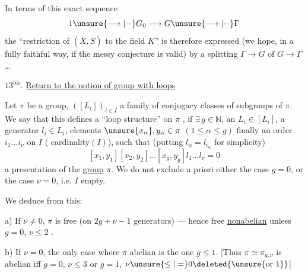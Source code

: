 

In terms of this exact sequence
\[
1\unsure{\longrightarrow|-}G_0\longrightarrow G\unsure{\longrightarrow|-}\Gamma
\]
the ``restriction of $(\overline X,\overline S)$ to the field $K$'' is
therefore expressed (we hope, in a fully faithful way,
if the messy conjecture is valid) by
a splitting $\Gamma\to G$ of $G\to\Gamma$\dots

$13^{\mathrm{bis}}$. \uline{Return to the notion of group with loops}

Let $\pi$ be a group, $([L_i])_{i\in I}$ a family
of conjugacy classes of subgroups of
$\pi$. We say that this defines a 
``loop structure'' on $\pi$ \inserted{[of type $(g,\nu)$]}, if $\exists\,g\in\mathbb N$,
 an $L_i\in[L_i]$, a generator
$l_i\in L_i$, elements $\unsure{x_\alpha},y_\alpha\in\pi$ $(1\le\alpha\le g)$
finally an order $i_1\dots i_\nu$ on $I$ ( \inserted{$\nu=$} cardinality$(I)$),
such that (putting $l_\alpha=l_{i_\alpha}$ for simplicity)
\[
[x_1,y_1][x_2,y_2]\dots[x_g,y_g]l_1\dots l_\nu=0
\]
 a presentation of the \uline{group} $\pi$. We
do not exclude a priori either the case $g=0$, or the case $\nu=0$,
i.e. $I$ empty.

We deduce from this:

a) If $\nu\ne0$, $\pi$ is free (on $2g+\nu-1$ generators) ---
hence free \uline{nonabelian} unless $g=0$, $\nu\le2$ .



b) If $\nu=0$, the only case where $\pi$ abelian is the one
$g\le1$. [Thus $\pi\simeq\pi_{g,\nu}$ is abelian iff
$g=0$, $\nu\le3$ or $g=1$, $\nu\unsure{\le|=}0\deleted{\unsure{\text{or }1}}$]

